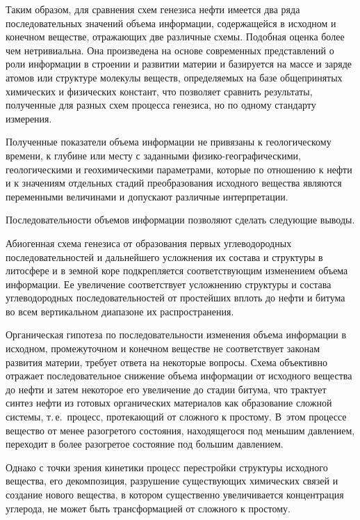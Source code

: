 \begin{multicols}{2}
     Таким образом, для сравнения схем генезиса нефти имеется два ряда 
последовательных значений объема информации, содержащейся в исходном и 
конечном веществе, отражающих две различные схемы. Подобная оценка более 
чем нетривиальна. Она произведена на основе современных пред\-став\-ле\-ний о роли 
информации в строении и развитии материи и базируется на массе и заряде атомов 
или структуре молекулы веществ, определяемых на базе общепринятых 
химических и физических констант, что позволяет сравнить результаты, 
полученные для разных схем процесса генезиса, но по одному стандарту 
измерения. 
     
     Полученные показатели объема информации не привязаны к геологическому 
времени, к глубине или месту с заданными физико-географическими, 
геологическими и геохимическими параметрами, которые по отношению к нефти и 
к значениям отдельных стадий преобразования исходного вещества являются 
переменными величинами и допускают различные интерпретации. 
     
     Последовательности объемов информации позволяют сделать следующие 
выводы.
     
     Абиогенная схема генезиса от образования первых углеводородных 
последовательностей и дальнейшего усложнения их состава и структуры в\linebreak 
литосфере и в земной коре подкрепляется соответствующим изменением объема 
информации. Ее увеличение соответствует усложнению структуры и состава 
углеводородных последовательностей от простейших вплоть до нефти и битума во 
всем вертикальном диапазоне их распространения.
     
     Органическая гипотеза по последовательности изменения объема 
информации в исходном, промежуточном и конечном веществе не соответствует 
законам развития материи, требует ответа на некоторые вопросы. Схема 
объективно отражает последовательное снижение объема информации от 
исходного вещества до нефти и затем некоторое его увеличение до стадии битума, 
что трактует синтез нефти из готовых органических материалов как образование 
сложной системы, т.\,е.\ процесс, протекающий от сложного к простому. В~этом 
процессе вещество от менее разогретого состояния, находящегося под меньшим 
давлением, переходит в более разогретое состояние под большим давлением. 
     
     Однако с точки зрения кинетики процесс перестройки структуры исходного 
вещества, его декомпозиция, разрушение существующих химических связей и 
создание нового вещества, в котором существенно увеличивается концентрация 
углерода, не может быть трансформацией от сложного к прос\-тому. 
     

\end{multicols}
